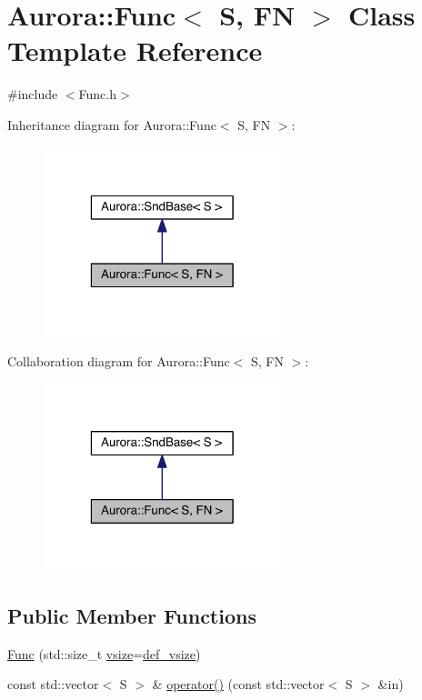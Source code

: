 \hypertarget{class_aurora_1_1_func}{}\section{Aurora\+:\+:Func$<$ S, FN $>$ Class Template Reference}
\label{class_aurora_1_1_func}


{\ttfamily \#include $<$Func.\+h$>$}



Inheritance diagram for Aurora\+:\+:Func$<$ S, FN $>$\+:
\nopagebreak
\begin{figure}[H]
\begin{center}
\leavevmode
\includegraphics[width=196pt]{class_aurora_1_1_func__inherit__graph}
\end{center}
\end{figure}


Collaboration diagram for Aurora\+:\+:Func$<$ S, FN $>$\+:
\nopagebreak
\begin{figure}[H]
\begin{center}
\leavevmode
\includegraphics[width=196pt]{class_aurora_1_1_func__coll__graph}
\end{center}
\end{figure}
\subsection*{Public Member Functions}
\begin{DoxyCompactItemize}
\item 
\hyperlink{class_aurora_1_1_func_a2a97c0f4eaf70c7e922876debeb14abe}{Func} (std\+::size\+\_\+t \hyperlink{class_aurora_1_1_snd_base_af9e21aaf411b17f7a8221c991ce5d291}{vsize}=\hyperlink{namespace_aurora_afaaddf667a06e7ce23c667a8b7295263}{def\+\_\+vsize})
\item 
const std\+::vector$<$ S $>$ \& \hyperlink{class_aurora_1_1_func_aa7664032aef8be96cdfd33b968a1f226}{operator()} (const std\+::vector$<$ S $>$ \&in)
\end{DoxyCompactItemize}


